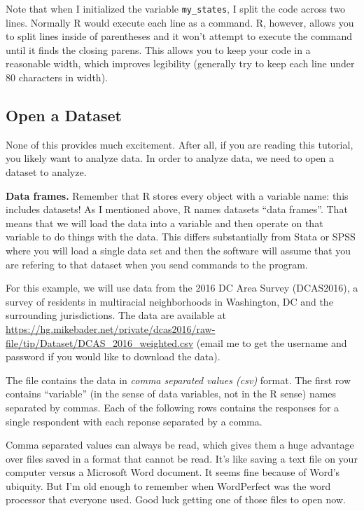\documentclass[]{article}
\begin{document}
Note that when I initialized the variable \texttt{my\_states}, I split
the code across two lines. Normally R would execute each line as a
command. R, however, allows you to split lines inside of parentheses and
it won't attempt to execute the command until it finds the closing
parens. This allows you to keep your code in a reasonable width, which
improves legibility (generally try to keep each line under 80 characters
in width).

\subsection{Open a Dataset}\label{open-a-dataset}

None of this provides much excitement. After all, if you are reading
this tutorial, you likely want to analyze data. In order to analyze
data, we need to open a dataset to analyze.

\textbf{Data frames.} Remember that R stores every object with a
variable name: this includes datasets! As I mentioned above, R names
datasets ``data frames''. That means that we will load the data into a
variable and then operate on that variable to do things with the data.
This differs substantially from Stata or SPSS where you will load a
single data set and then the software will assume that you are refering
to that dataset when you send commands to the program.

For this example, we will use data from the 2016 DC Area Survey
(DCAS2016), a survey of residents in multiracial neighborhoods in
Washington, DC and the surrounding jurisdictions. The data are available
at
\url{https://hg.mikebader.net/private/dcas2016/raw-file/tip/Dataset/DCAS_2016_weighted.csv}
(email me to get the username and password if you would like to download
the data).

The file contains the data in \emph{comma separated values (csv)}
format. The first row contains ``variable'' (in the sense of data
variables, not in the R sense) names separated by commas. Each of the
following rows contains the responses for a single respondent with each
reponse separated by a comma.

Comma separated values can always be read, which gives them a huge
advantage over files saved in a format that cannot be read. It's like
saving a text file on your computer versus a Microsoft Word document. It
seems fine because of Word's ubiquity. But I'm old enough to remember
when WordPerfect was the word processor that everyone used. Good luck
getting one of those files to open now.
\end{document}
